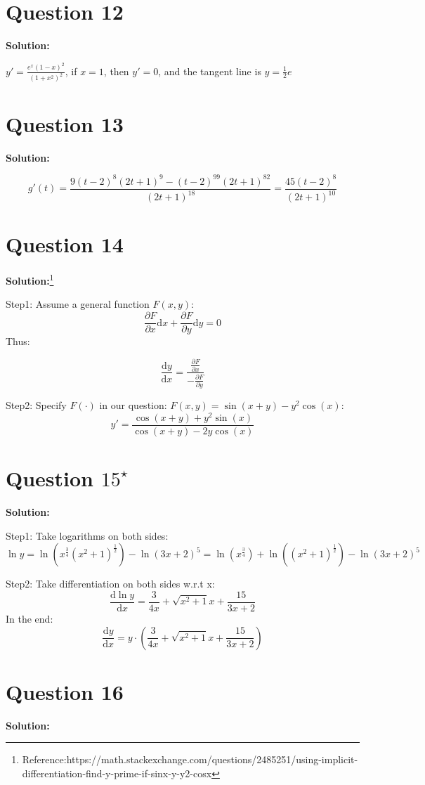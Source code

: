 \documentclass[11pt]{article} %
\begin{document}
\section{Question 12}
\textbf{Solution:}

$y'=\frac{e^x(1-x)^2}{(1+x^2)^2}$, if $x=1$, then $y'=0$, and the tangent line is $y=\frac{1}{2}e$

\section{Question 13}
\textbf{Solution:}

$$g'(t)=\frac{9(t-2)^8(2t+1)^9-(t-2)^99(2t+1)^82}{(2t+1)^{18}}=\frac{45(t-2)^8}{(2t+1)^{10}}$$

\section{Question 14}
\textbf{Solution:}\footnote{Reference:https://math.stackexchange.com/questions/2485251/using-implicit-differentiation-find-y-prime-if-sinx-y-y2-cosx}

Step1: Assume a general function $F(x,y)$:
$$\frac{\partial F}{\partial x}\mathrm{d}x+\frac{\partial F}{\partial y}\mathrm{d}y=0$$
Thus:

 $$\frac{\mathrm{d}y}{\mathrm{d}x}=\frac{\frac{\partial F}{\partial x}}{-\frac{\partial F}{\partial y}}$$
 
 Step2: Specify $F(\cdot)$ in our question: $F(x,y)=\sin(x+y)-y^2\cos(x)$:
 $$y' =\frac{\cos(x+y)+y^2\sin(x)}{\cos(x+y)-2y\cos(x)}$$
 
 \section{Question $15^\star$}
 \textbf{Solution:}
 
 Step1: Take logarithms on both sides:
 $$\ln y= \ln(x^{\frac{3}{4}}(x^2+1)^{\frac{1}{2}})-\ln(3x+2)^5=\ln(x^{\frac{3}{4}})+\ln((x^2+1)^{\frac{1}{2}})-\ln(3x+2)^5$$
 
 Step2: Take differentiation on both sides w.r.t x:
 $$\frac{\mathrm{d}\ln y}{\mathrm{d}x}=\frac{3}{4x}+\sqrt{x^2+1}x+\frac{15}{3x+2}$$
 In the end:
 $$\frac{\mathrm{d}y}{\mathrm{d}x}=y\cdot\left(\frac{3}{4x}+\sqrt{x^2+1}x+\frac{15}{3x+2}\right)$$
 
 \section{Question 16}
 \textbf{Solution:}
 
\end{document}
